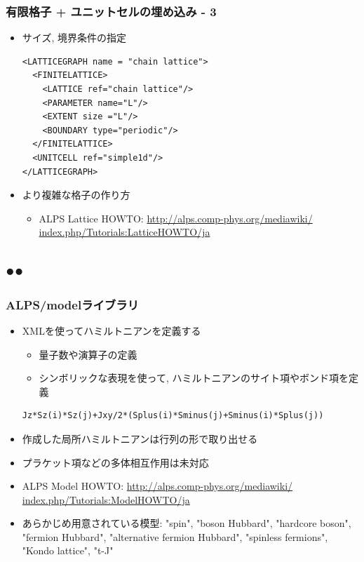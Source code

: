 \begin{frame}[t,fragile]
  \frametitle{有限格子 + ユニットセルの埋め込み - 3}
  \begin{itemize}
  \item サイズ, 境界条件の指定
    \begin{lstlisting}
<LATTICEGRAPH name = "chain lattice">
  <FINITELATTICE>
    <LATTICE ref="chain lattice"/>
    <PARAMETER name="L"/>
    <EXTENT size ="L"/>
    <BOUNDARY type="periodic"/>
  </FINITELATTICE>
  <UNITCELL ref="simple1d"/>
</LATTICEGRAPH>
\end{lstlisting}
  \item より複雑な格子の作り方
    \begin{itemize}
    \item ALPS Lattice HOWTO: {\small \href{http://alps.comp-phys.org/mediawiki/index.php/Tutorials:LatticeHOWTO/ja}{http://alps.comp-phys.org/mediawiki/ index.php/Tutorials:LatticeHOWTO/ja}}
    \end{itemize}
  \end{itemize}
\end{frame}

\subsection*{{\protect\color{red}●}{\protect\color{blue}●}}

\begin{frame}[t,fragile]
  \frametitle{ALPS/modelライブラリ}
  \begin{itemize}
  \item XMLを使ってハミルトニアンを定義する
    \begin{itemize}  
    \item 量子数や演算子の定義
    \item シンボリックな表現を使って, ハミルトニアンのサイト項やボンド項を定義
    \end{itemize}
    \begin{lstlisting}
Jz*Sz(i)*Sz(j)+Jxy/2*(Splus(i)*Sminus(j)+Sminus(i)*Splus(j))
\end{lstlisting}
  \item 作成した局所ハミルトニアンは行列の形で取り出せる
  \item プラケット項などの多体相互作用は未対応
  \item ALPS Model HOWTO: {\small \href{http://alps.comp-phys.org/mediawiki/index.php/Tutorials:ModelHOWTO/ja}{http://alps.comp-phys.org/mediawiki/ index.php/Tutorials:ModelHOWTO/ja}}
  \item あらかじめ用意されている模型: "spin", "boson Hubbard", "hardcore boson", "fermion Hubbard", "alternative fermion Hubbard", "spinless fermions", "Kondo lattice", "t-J"
  \end{itemize}
\end{frame}

